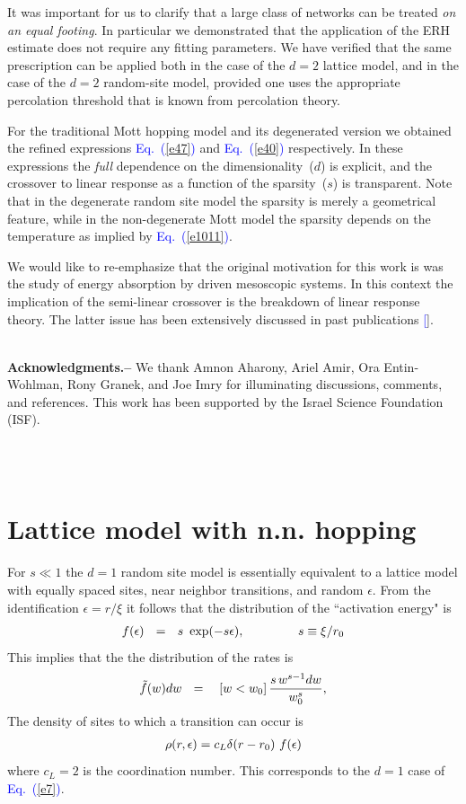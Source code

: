 \documentclass[aps,pre,floats,floatfix,twocolumn]{revtex4}
\newcommand{\mylabel}[1]{\label{#1}}
\newcommand{\beq}{\begin{eqnarray}}
\newcommand{\eeq}{\end{eqnarray}}
\newcommand{\be}[1]{\begin{eqnarray}\ifthenelse{#1=-1}
{\nonumber}{\ifthenelse{#1=0}{}{\mylabel{e#1}}}}
\newcommand{\Eq}[1]{\textcolor{blue}{Eq.\!\!~(\ref{#1})}}
\newcommand{\rmrk}[1]{#1}
\renewcommand{\cite}[1]{\textcolor{blue}{[\onlinecite{#1}}]} %
\begin{document}
It was important for us to clarify that a large class of networks 
can be treated {\em on an equal footing}. In particular we demonstrated that  
the application of the ERH estimate does not require any fitting parameters.
We have verified that the same prescription can be applied both in the case 
of the $d{=}2$ lattice model, and in the case of the $d{=}2$ random-site model, 
provided one uses the appropriate percolation threshold 
that is known from percolation theory.  

For the traditional Mott hopping model 
and its degenerated version we obtained 
the refined expressions \Eq{e47} and \Eq{e40} respectively. 
%
\rmrk{In these expressions the {\em full} dependence on 
the dimensionality~($d$) is explicit, and the crossover 
to linear response as a function of the sparsity~($s$)
is transparent. Note that in the degenerate random site model 
the sparsity is merely a geometrical feature, while in the 
non-degenerate Mott model the sparsity depends on the temperature 
as implied by \Eq{e1011}.}     

We would like to re-emphasize that the original motivation 
for this work is was the study of energy absorption by driven mesoscopic systems. 
In this context the implication of the semi-linear crossover 
is the breakdown of linear response theory. The latter 
issue has been extensively discussed in past publications \cite{slk}. 

\ \\

{\bf Acknowledgments.-- }
We thank Amnon Aharony, Ariel Amir, Ora Entin-Wohlman, Rony Granek, and Joe Imry 
for illuminating discussions, comments, and references. 
This work has been supported by the Israel Science Foundation (ISF). 




\ \\ \ \\ 

\appendix




\section{Lattice model with n.n. hopping}

\label{aLattice}

For $s \ll 1$ the $d{=}1$ random site model is 
essentially equivalent to a lattice model 
with equally spaced sites, 
near neighbor transitions, 
and random $\epsilon$.
From the identification $\epsilon=r/\xi$ 
it follows that the distribution 
of the ``activation energy" is 
%
\beq
f(\epsilon) \ \ = \ \ s \ \exp(-s\epsilon), 
\hspace{15mm} s \equiv \xi/r_0
\eeq
%
This implies that the the distribution of the rates is 
%
\be{15}
\tilde{f}(w) dw  \ \  =  \ \    \ [w < w_0] \, \frac{s \, w^{s-1} dw}{w_0^s}, 
\eeq
%
The density of sites to which a transition can occur is
%
\be{17}
\rho(r,\epsilon) =  c_L \delta(r-r_0) \ f(\epsilon)  
\eeq 
%
where $c_L=2$ is the coordination number. 
This corresponds to the $d{=}1$ case of \Eq{e7}.
\end{document}
